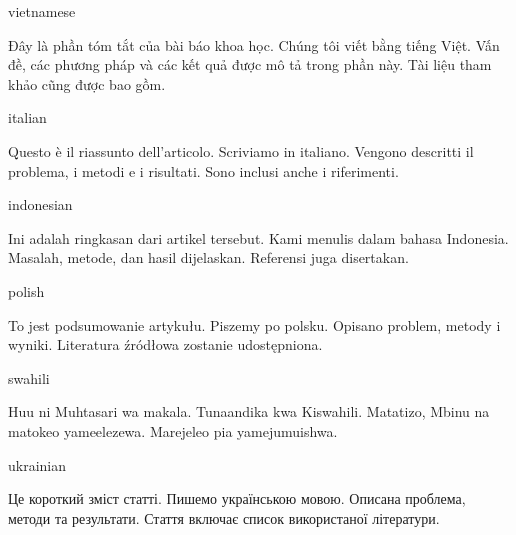 \documentclass[colorlinks,nofoot,fontspec,spanish,japanese,russian,greek,ukrainian,vietnamese,french,portuguese,turkish,polish,indonesian,italian,german,latin,serbianc,bidi=basic]{asmeconf}
\begin{document}
{\NotoSerif
\begin{selectlanguage}{vietnamese}
\begin{abstract*}
Đây là phần tóm tắt của bài báo khoa học. Chúng tôi viết bằng tiếng Việt. Vấn đề, các phương pháp và các kết quả được mô tả trong phần này. Tài liệu tham khảo cũng được bao gồm.%
\end{abstract*}
\end{selectlanguage}%

\begin{selectlanguage}{italian}
\begin{abstract*}
Questo è il riassunto dell'articolo. Scriviamo in italiano. Vengono descritti il ​​problema, i metodi e i risultati. Sono inclusi anche i riferimenti.
\end{abstract*}
\end{selectlanguage}%

\begin{selectlanguage}{indonesian}
\begin{abstract*}
Ini adalah ringkasan dari artikel tersebut. Kami menulis dalam bahasa Indonesia. Masalah, metode, dan hasil dijelaskan. Referensi juga disertakan.
\end{abstract*}
\end{selectlanguage}%

\begin{selectlanguage}{polish}
\begin{abstract*}
To jest podsumowanie artykułu. Piszemy po polsku. Opisano problem, metody i wyniki. Literatura źródłowa zostanie udostępniona.
\end{abstract*}
\end{selectlanguage}%

\begin{selectlanguage}{swahili}
\begin{abstract*}
Huu ni Muhtasari wa makala. Tunaandika kwa Kiswahili.
Matatizo, Mbinu na matokeo yameelezewa. Marejeleo pia yamejumuishwa.
\end{abstract*}
\end{selectlanguage}%
}%

\begin{selectlanguage}{ukrainian}
\begin{abstract*}
Це короткий зміст статті. Пишемо українською мовою. Описана проблема, методи та результати. Стаття включає список використаної літератури.
\end{abstract*}
\end{selectlanguage}%
\end{document}
